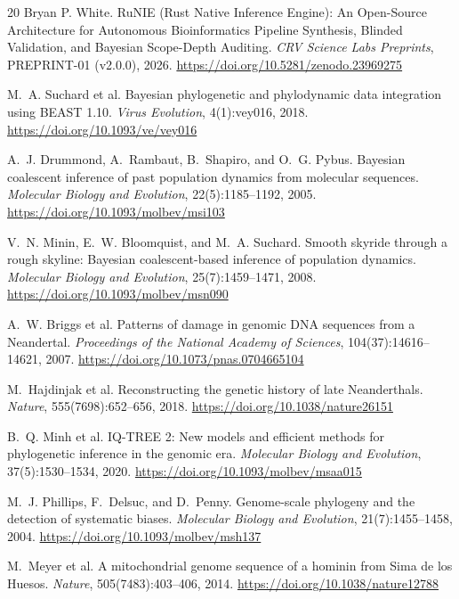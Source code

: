 \documentclass[10pt,letterpaper]{article}
\begin{document}
\begin{thebibliography}{20}
Bryan P. White.
\newblock RuNIE (Rust Native Inference Engine): An Open-Source Architecture for Autonomous Bioinformatics Pipeline Synthesis, Blinded Validation, and Bayesian Scope-Depth Auditing.
\newblock \emph{CRV Science Labs Preprints}, PREPRINT-01 (v2.0.0), 2026. \url{https://doi.org/10.5281/zenodo.23969275}

M.~A. Suchard et al.
\newblock Bayesian phylogenetic and phylodynamic data integration using BEAST 1.10.
\newblock \emph{Virus Evolution}, 4(1):vey016, 2018. \url{https://doi.org/10.1093/ve/vey016}

A.~J. Drummond, A.~Rambaut, B.~Shapiro, and O.~G. Pybus.
\newblock Bayesian coalescent inference of past population dynamics from molecular sequences.
\newblock \emph{Molecular Biology and Evolution}, 22(5):1185--1192, 2005. \url{https://doi.org/10.1093/molbev/msi103}

V.~N. Minin, E.~W. Bloomquist, and M.~A. Suchard.
\newblock Smooth skyride through a rough skyline: Bayesian coalescent-based inference of population dynamics.
\newblock \emph{Molecular Biology and Evolution}, 25(7):1459--1471, 2008. \url{https://doi.org/10.1093/molbev/msn090}

A.~W. Briggs et al.
\newblock Patterns of damage in genomic DNA sequences from a Neandertal.
\newblock \emph{Proceedings of the National Academy of Sciences}, 104(37):14616--14621, 2007. \url{https://doi.org/10.1073/pnas.0704665104}

M.~Hajdinjak et al.
\newblock Reconstructing the genetic history of late Neanderthals.
\newblock \emph{Nature}, 555(7698):652--656, 2018. \url{https://doi.org/10.1038/nature26151}

B.~Q. Minh et al.
\newblock IQ-TREE 2: New models and efficient methods for phylogenetic inference in the genomic era.
\newblock \emph{Molecular Biology and Evolution}, 37(5):1530--1534, 2020. \url{https://doi.org/10.1093/molbev/msaa015}

M.~J. Phillips, F.~Delsuc, and D.~Penny.
\newblock Genome-scale phylogeny and the detection of systematic biases.
\newblock \emph{Molecular Biology and Evolution}, 21(7):1455--1458, 2004. \url{https://doi.org/10.1093/molbev/msh137}

M.~Meyer et al.
\newblock A mitochondrial genome sequence of a hominin from Sima de los Huesos.
\newblock \emph{Nature}, 505(7483):403--406, 2014. \url{https://doi.org/10.1038/nature12788}


\end{thebibliography}
\end{document}
